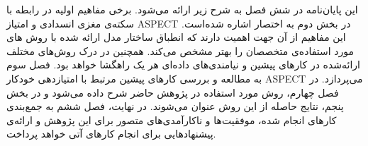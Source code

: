 
این پایان‌نامه در شش فصل به شرح زیر ارائه می‌شود.
برخی مفاهیم اولیه در رابطه با سکته‌ی مغزی انسدادی و امتیاز ASPECT در بخش دوم به اختصار اشاره شده‌است.
این مفاهیم از آن جهت اهمیت دارند که انطباق ساختار مدل ارائه شده با روش های مورد استفاده‌ی متخصصان را بهتر مشخص می‌کند.
همچنین در درک روش‌های مختلف ارائه‌شده در کارهای پیشین و نیامندی‌های داده‌ای هر یک راهگشا خواهد بود.
فصل سوم به مطالعه و بررسی کارهای پیشین مرتبط با امتیاز‌دهی خودکار ASPECT می‌پردازد.
در فصل چهارم، روش مورد استفاده در پژوهش حاضر شرح داده می‌شود 
و در بخش پنجم، نتایج حاصله از این روش عنوان می‌شوند.
در نهایت،‌ فصل ششم به جمع‌بندی کارهای انجام شده، موفقیت‌ها و ناکارآمدی‌های متصور برای این پژوهش و ارائه‌ی پیشنهادهایی برای انجام کارهای آتی خواهد پرداخت.